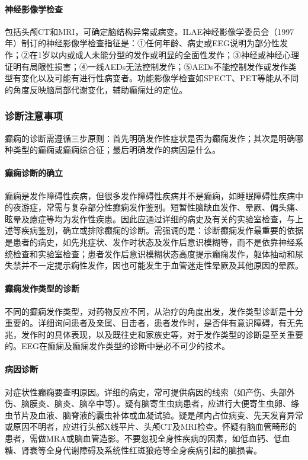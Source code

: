 \paragraph{神经影像学检查}

包括头颅CT和MRI，可确定脑结构异常或病变。ILAE神经影像学委员会（1997年）制订的神经影像学检查指征是：①任何年龄、病史或EEG说明为部分性发作；②在1岁以内或成人未能分型的发作或明显的全面性发作；③神经或神经心理证明有局限性损害；④一线AEDs无法控制发作；⑤AEDs不能控制发作或发作类型有变化以及可能有进行性病变者。功能影像学检查如SPECT、PET等能从不同的角度反映脑局部代谢变化，辅助癫痫灶的定位。

\subsubsection{诊断注意事项}

癫痫的诊断需遵循三步原则：首先明确发作性症状是否为癫痫发作；其次是明确哪种类型的癫痫或癫痫综合征；最后明确发作的病因是什么。

\paragraph{癫痫诊断的确立}

癫痫是发作障碍性疾病，但很多发作障碍性疾病并不是癫痫，如睡眠障碍性疾病中的夜游症，常需与复杂部分性癫痫发作鉴别。短暂性脑缺血发作、晕厥、偏头痛、眩晕及癔症等均为发作性疾患。因此应通过详细的病史及有关的实验室检查，与上述等疾病鉴别，确立或排除癫痫的诊断。需强调的是：诊断癫痫发作最重要的依据是患者的病史，如先兆症状、发作时状态及发作后意识模糊等，而不是依靠神经系统检查和实验室检查；患者发作后意识模糊状态高度提示癫痫发作，躯体抽动和尿失禁并不一定提示痫性发作，因也可能发生于血管迷走性晕厥及其他原因的晕厥。

\paragraph{癫痫发作类型的诊断}

不同的癫痫发作类型，对药物反应不同，从治疗的角度出发，发作类型诊断是十分重要的。详细询问患者及亲属、目击者，患者发作时，是否伴有意识障碍，有无先兆，发作时的具体表现，以及既往史和家族史等，对于发作类型的诊断是至关重要的。EEG在癫痫及癫痫发作类型的诊断中是必不可少的技术。

\paragraph{病因诊断}

对症状性癫痫要查明原因。详细的病史，常可提供病因的线索（如产伤、头部外伤、脑膜炎、脑炎、脑卒中等）。疑有脑寄生虫病患者，应进行大便寄生虫卵、绦虫节片及血液、脑脊液的囊虫补体或血凝试验。疑是颅内占位病变、先天发育异常或原因不明者，应进行头部X线平片、头颅CT及MRI检查。怀疑有脑血管畸形的患者，需做MRA或脑血管造影。不要忽视全身性疾病的因素，如低血钙、低血糖、肾衰等全身代谢障碍及系统性红斑狼疮等全身疾病引起的脑损害。

